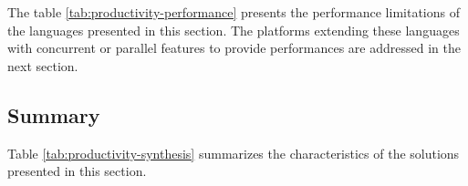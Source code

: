 % 


The table \ref{tab:productivity-performance} presents the performance limitations of the languages presented in this section.
The platforms extending these languages with concurrent or parallel features to provide performances are addressed in the next section.



\subsection{Summary} \label{chapter3:software-productivity:summary}

Table \ref{tab:productivity-synthesis} summarizes the characteristics of the solutions presented in this section.


\endinput






































